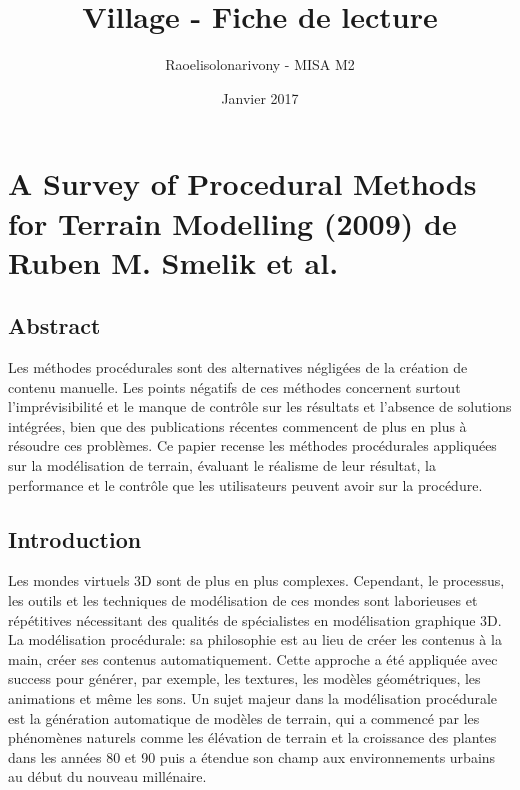 \documentclass[11pt]{article}
\title{Village - Fiche de lecture}
\author{Raoelisolonarivony - MISA M2}
\date{Janvier 2017}
\begin{document}
\maketitle

\section{A Survey of Procedural Methods for Terrain Modelling (2009) de Ruben M. Smelik et al.}

\subsection{Abstract}

Les méthodes procédurales sont des alternatives négligées de la création de contenu manuelle. Les points négatifs de ces méthodes concernent surtout l'imprévisibilité et le manque de contrôle sur les résultats et l'absence de solutions intégrées, bien que des publications récentes commencent de plus en plus à résoudre ces problèmes. Ce papier recense les méthodes procédurales appliquées sur la modélisation de terrain, évaluant le réalisme de leur résultat, la performance et le contrôle que les utilisateurs peuvent avoir sur la procédure.

\subsection{Introduction}

Les mondes virtuels 3D sont de plus en plus complexes. Cependant, le processus, les outils et les techniques de modélisation de ces mondes sont laborieuses et répétitives nécessitant des qualités de spécialistes en modélisation graphique 3D.
La modélisation procédurale: sa philosophie est au lieu de créer les contenus à la main, créer ses contenus automatiquement. Cette approche a été appliquée avec success pour générer, par exemple, les textures, les modèles géométriques, les animations et même les sons. Un sujet majeur dans la modélisation procédurale est la génération automatique de modèles de terrain, qui a commencé par les phénomènes naturels comme les élévation de terrain et la croissance des plantes dans les années 80 et 90 puis a étendue son champ aux environnements urbains au début du nouveau millénaire. \newline
\end{document}
